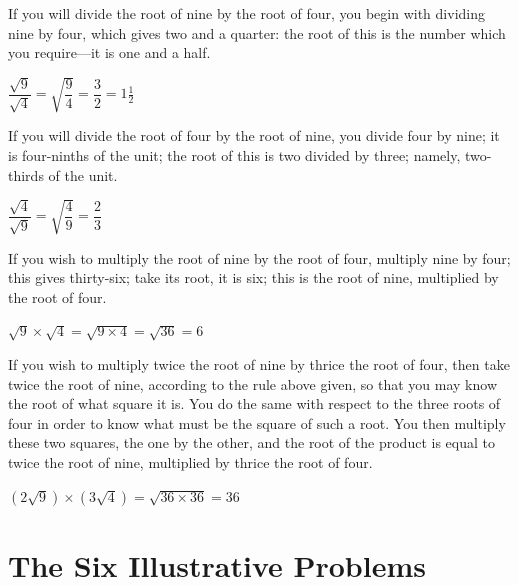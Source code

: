 \documentclass[11pt,a4paper,openany,oneside]{book}
\begin{document}
\begin{minipage}[t]{0.48\textwidth}
\raggedright

If you will divide the root of nine by the root of four, you begin with dividing nine by four, which gives two and a quarter: the root of this is the number which you require---it is one and a half.

$\dfrac{\sqrt{9}}{\sqrt{4}} = \sqrt{\dfrac{9}{4}} = \dfrac{3}{2} = 1\tfrac{1}{2}$

\vspace{0.3cm}

If you will divide the root of four by the root of nine, you divide four by nine; it is four-ninths of the unit; the root of this is two divided by three; namely, two-thirds of the unit.

$\dfrac{\sqrt{4}}{\sqrt{9}} = \sqrt{\dfrac{4}{9}} = \dfrac{2}{3}$

\vspace{0.3cm}

If you wish to multiply the root of nine by the root of four, multiply nine by four; this gives thirty-six; take its root, it is six; this is the root of nine, multiplied by the root of four.

$\sqrt{9} \times \sqrt{4} = \sqrt{9 \times 4} = \sqrt{36} = 6$

\vspace{0.3cm}

If you wish to multiply twice the root of nine by thrice the root of four, then take twice the root of nine, according to the rule above given, so that you may know the root of what square it is. You do the same with respect to the three roots of four in order to know what must be the square of such a root. You then multiply these two squares, the one by the other, and the root of the product is equal to twice the root of nine, multiplied by thrice the root of four.

$(2\sqrt{9}) \times (3\sqrt{4}) = \sqrt{36 \times 36} = 36$

\end{minipage}
\vspace{0.3cm}

\newpage

\chapter{The Six Illustrative Problems}
\label{ch:six-problems}
\end{document}
